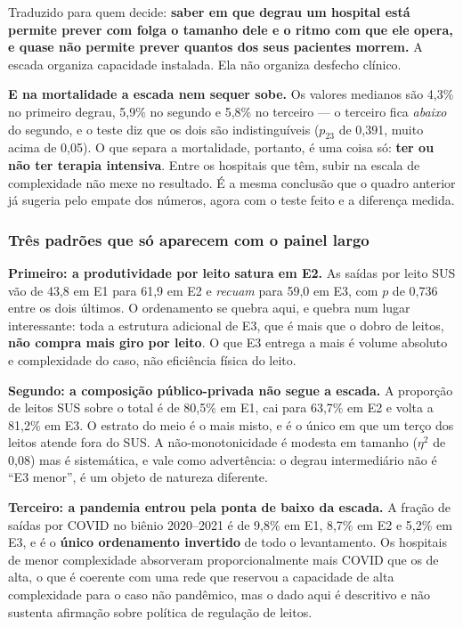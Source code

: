 Traduzido para quem decide: \textbf{saber em que degrau um hospital está
permite prever com folga o tamanho dele e o ritmo com que ele opera, e quase
não permite prever quantos dos seus pacientes morrem.} A escada organiza
capacidade instalada. Ela não organiza desfecho clínico.

\textbf{E na mortalidade a escada nem sequer sobe.} Os valores medianos são
4,3\% no primeiro degrau, 5,9\% no segundo e 5,8\% no terceiro --- o
terceiro fica \emph{abaixo} do segundo, e o teste diz que os dois são
indistinguíveis ($p_{23}$ de 0,391, muito acima de 0,05). O que separa a
mortalidade, portanto, é uma coisa só: \textbf{ter ou não ter terapia
intensiva}. Entre os hospitais que têm, subir na escala de complexidade não
mexe no resultado. É a mesma conclusão que o quadro anterior já sugeria pelo
empate dos números, agora com o teste feito e a diferença medida.

\subsubsection*{Três padrões que só aparecem com o painel largo}

\textbf{Primeiro: a produtividade por leito satura em E2.} As saídas por
leito SUS vão de 43,8 em E1 para 61,9 em E2 e \emph{recuam} para 59,0 em E3,
com $p$ de 0,736 entre os dois últimos. O ordenamento se quebra aqui, e
quebra num lugar interessante: toda a estrutura adicional de E3, que é mais
que o dobro de leitos, \textbf{não compra mais giro por leito}. O que E3
entrega a mais é volume absoluto e complexidade do caso, não eficiência
física do leito.

\textbf{Segundo: a composição público-privada não segue a escada.} A
proporção de leitos SUS sobre o total é de 80,5\% em E1, cai para 63,7\% em
E2 e volta a 81,2\% em E3. O estrato do meio é o mais misto, e é o único em
que um terço dos leitos atende fora do SUS. A não-monotonicidade é modesta
em tamanho ($\eta^2$ de 0,08) mas é sistemática, e vale como advertência: o
degrau intermediário não é ``E3 menor'', é um objeto de natureza diferente.

\textbf{Terceiro: a pandemia entrou pela ponta de baixo da escada.} A
fração de saídas por COVID no biênio 2020--2021 é de 9,8\% em E1, 8,7\% em
E2 e 5,2\% em E3, e é o \textbf{único ordenamento invertido} de todo o
levantamento. Os hospitais de menor complexidade absorveram
proporcionalmente mais COVID que os de alta, o que é coerente com uma rede
que reservou a capacidade de alta complexidade para o caso não pandêmico,
mas o dado aqui é descritivo e não sustenta afirmação sobre política de
regulação de leitos.

